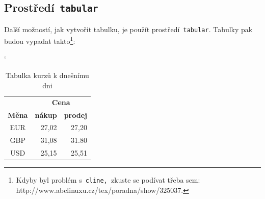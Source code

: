 \documentclass[11pt, a4paper]{article}
\begin{document}
\subsection{Prostředí\texttt{ tabular }}
Další možností, jak vytvořit tabulku, je použít prostředí\texttt{ tabular}. Tabulky pak budou vypadat takto\footnote{Kdyby byl problém s\texttt{ cline, }zkuste se podívat třeba sem: {http://www.abclinuxu.cz/tex/poradna/show/325037}.}:\\
%
\begin{table}[ht]
\catcode`
\begin{center}
\begin{tabular}{|c|r|r|}
\hline
 & \multicolumn{2}{c|}{\textbf{Cena}} \\
\cline{2-3}
\textbf{Měna} & \textbf{nákup} & \textbf{prodej}\\
\hline
EUR & 27,02 &27,20\\
GBP & 31,08 & 31.80\\
USD & 25,15 & 25,51\\
\hline
\end{tabular}
\caption{Tabulka kurzů k dnešnímu dni} \label{tab1}
\end{center}
\end{table}
%
\end{document}
